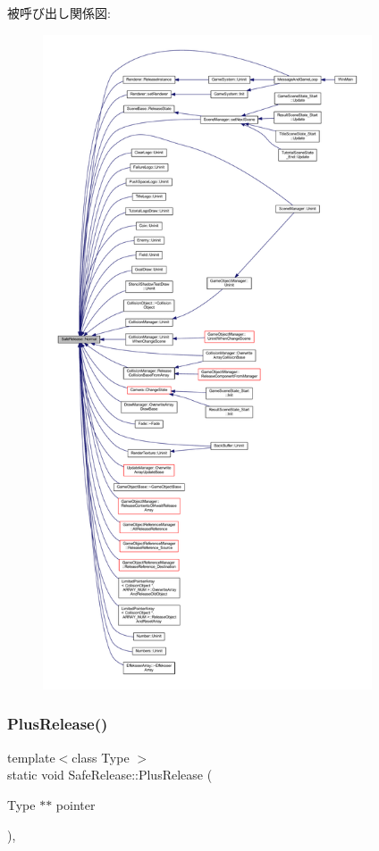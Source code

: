 被呼び出し関係図\+:
\nopagebreak
\begin{figure}[H]
\begin{center}
\leavevmode
\includegraphics[height=550pt]{class_safe_release_a6ecab682df939c28d8867a67c2f4b51f_icgraph}
\end{center}
\end{figure}
\mbox{\label{class_safe_release_a507950335a85da67c1722cce83dca9ae}} 
\subsubsection{\texorpdfstring{Plus\+Release()}{PlusRelease()}}
{\footnotesize\ttfamily template$<$class Type $>$ \\
static void Safe\+Release\+::\+Plus\+Release (\begin{DoxyParamCaption}\item[{Type $\ast$$\ast$}]{pointer }\end{DoxyParamCaption})\hspace{0.3cm}{\ttfamily [inline]}, {\ttfamily [static]}}



